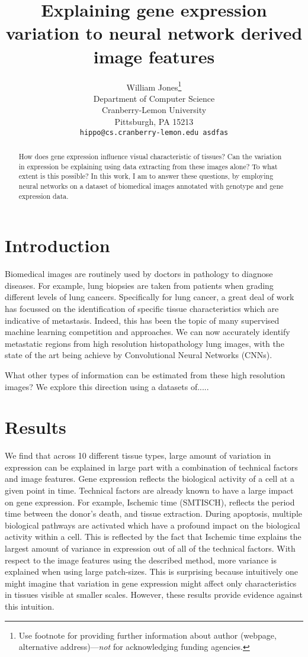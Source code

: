 \documentclass{article}
\title{Explaining gene expression variation to neural network derived image features}
\author{
  William Jones\thanks{Use footnote for providing further
    information about author (webpage, alternative
    address)---\emph{not} for acknowledging funding agencies.} \\
  Department of Computer Science\\
  Cranberry-Lemon University\\
  Pittsburgh, PA 15213 \\
  \texttt{hippo@cs.cranberry-lemon.edu  asdfas} \\
}
\begin{document}

\maketitle

\begin{abstract}
How does gene expression influence visual characteristic of tissues? Can the variation in expression be explaining using data extracting from these images alone? To what extent is this possible? In this work, I am to answer these questions, by employing neural networks on a dataset of biomedical images annotated with genotype and gene expression data.
\end{abstract}

\section{Introduction}
Biomedical images are routinely used by doctors in pathology to diagnose diseases. For example, lung biopsies are taken from patients when grading different levels of lung cancers. Specifically for lung cancer, a great deal of work has focussed on the identification of specific tissue characteristics which are indicative of metastasis. Indeed, this has been the topic of many supervised machine learning competition and approaches. We can now accurately identify metastatic regions from high resolution histopathology lung images, with the state of the art being achieve by Convolutional Neural Networks (CNNs).

What other types of information can be estimated from these high resolution images? We explore this direction using a datasets of.....


\section{Results}
We find that across 10 different tissue types, large amount of variation in expression can be explained in large part with a combination of technical factors and image features. Gene expression reflects the biological activity of a cell at a given point in time. Technical factors are already known to have a large impact on gene expression. For example, Ischemic time (SMTISCH), reflects the period time between the donor's death, and tissue extraction. During apoptosis, multiple biological pathways are activated which have a profound impact on the biological activity within a cell. This is reflected by the fact that Ischemic time explains the largest amount of variance in expression out of all of the technical factors. With respect to the image features using the described method, more variance is explained when using large patch-sizes. This is surprising because intuitively one might imagine that variation in gene expression might affect only characteristics in tissues visible at smaller scales. However, these results provide evidence against this intuition.
\end{document}
